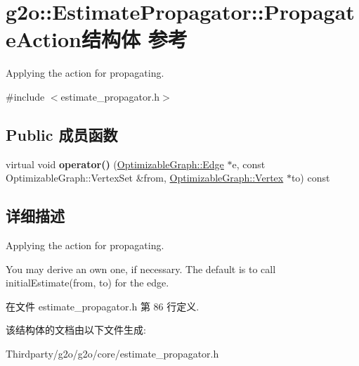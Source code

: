 \hypertarget{structg2o_1_1EstimatePropagator_1_1PropagateAction}{\section{g2o\-:\-:Estimate\-Propagator\-:\-:Propagate\-Action结构体 参考}
\label{structg2o_1_1EstimatePropagator_1_1PropagateAction}
}


Applying the action for propagating.  




{\ttfamily \#include $<$estimate\-\_\-propagator.\-h$>$}

\subsection*{Public 成员函数}
\begin{DoxyCompactItemize}
\item 
\hypertarget{structg2o_1_1EstimatePropagator_1_1PropagateAction_a308da527eee4428cd15c2d6e2247e6ce}{virtual void {\bfseries operator()} (\hyperlink{classg2o_1_1OptimizableGraph_1_1Edge}{Optimizable\-Graph\-::\-Edge} $\ast$e, const Optimizable\-Graph\-::\-Vertex\-Set \&from, \hyperlink{classg2o_1_1OptimizableGraph_1_1Vertex}{Optimizable\-Graph\-::\-Vertex} $\ast$to) const }\label{structg2o_1_1EstimatePropagator_1_1PropagateAction_a308da527eee4428cd15c2d6e2247e6ce}

\end{DoxyCompactItemize}


\subsection{详细描述}
Applying the action for propagating. 

You may derive an own one, if necessary. The default is to call initial\-Estimate(from, to) for the edge. 

在文件 estimate\-\_\-propagator.\-h 第 86 行定义.



该结构体的文档由以下文件生成\-:\begin{DoxyCompactItemize}
\item 
Thirdparty/g2o/g2o/core/estimate\-\_\-propagator.\-h\end{DoxyCompactItemize}
